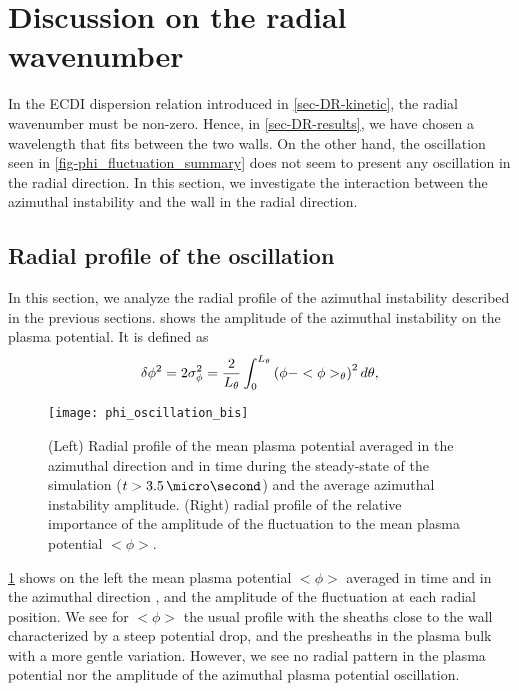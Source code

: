 
\section{ Discussion on the radial wavenumber}
  \label{sec-DR-BC}
    
  In the \ac{ECDI} dispersion relation introduced in \cref{sec-DR-kinetic}, the radial wavenumber must be non-zero.
  Hence, in \cref{sec-DR-results}, we have chosen a wavelength that fits between the two walls.
  On the other hand, the oscillation seen in \cref{fig-phi_fluctuation_summary} does not seem to present any oscillation in the radial direction.
  In this section, we investigate the interaction between the azimuthal instability and the wall in the radial direction.
  
  \subsection{Radial profile of the oscillation} \label{subsec-radial_prof}

  In this section, we analyze the radial profile of the azimuthal instability described in the previous sections.
   shows the amplitude of the azimuthal instability on the plasma potential.
  It is defined as
  \begin{equation} \label{eq-stdphi}
    \delta \phi^2 = 2 \sigma_{\phi}^2 = \frac{{2}}{L_{\theta}} \int_0^{L_{\theta}} \left(  \phi - <\phi>_{\theta}  \right) ^2 d\theta,
  \end{equation}
  
  \begin{figure}[!hbt]
    \centering
    \texttt{[image: phi\_oscillation\_bis]}
    \caption{(Left) Radial profile of the mean plasma potential averaged in the azimuthal direction  and in time during the steady-state of the simulation ($t > 3.5 \,\micro\second$) and the average azimuthal instability amplitude. (Right) radial profile of the relative importance of the amplitude of the fluctuation to the mean plasma potential $<\phi>$. }
    \label{fig-phi_osci_profile}
  \end{figure}
  
  \cref{fig-phi_osci_profile} shows on the left the mean plasma potential $<\phi>$ averaged in time and in the azimuthal direction , and the amplitude of the fluctuation at each radial position.
  We see for $<\phi>$ the usual profile with the sheaths close to the wall characterized by a steep potential drop, and the presheaths in the plasma bulk with a more gentle variation.
  However, we see no radial pattern in the plasma potential nor the amplitude of the azimuthal plasma potential oscillation.
  
